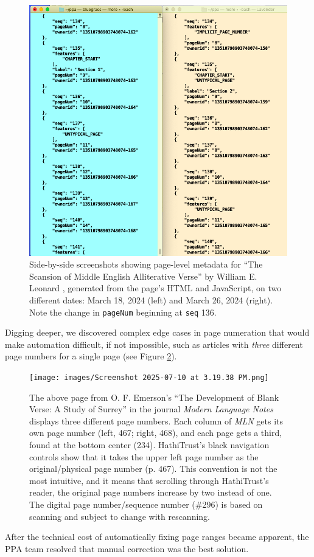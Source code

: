 \documentclass[final]{anthology-ch} %
\begin{document}
\begin{figure}
    \centering
    \includegraphics[width=0.5\linewidth]{images/y.png}
    \caption{Side-by-side screenshots showing page-level metadata for ``The Scansion of Middle English Alliterative Verse'' by William E. Leonard \cite{noauthor_scansion_nodate}, generated from the page's HTML and JavaScript, on two different dates: March 18, 2024 (left) and March 26, 2024 (right). Note the change in \texttt{pageNum} beginning at \texttt{seq} 136.}
    \label{fig:code-comparison}
\end{figure}

Digging deeper, we discovered complex edge cases in page numeration that would make automation difficult, if not impossible, such as articles with \textit{three} different page numbers for a single page (see Figure \ref{fig:MLN}).

\begin{figure}
    \centering
    \texttt{[image: images/Screenshot 2025-07-10 at 3.19.38 PM.png]}
    \caption{The above page from O. F. Emerson’s ``The Development of Blank Verse: A Study of Surrey'' in the journal \textit{Modern Language Notes} \cite{emerson_o_f_development_1889} displays three different page numbers. Each column of \textit{MLN }gets its own page number (left, 467; right, 468), and each page gets a third, found at the bottom center (234). HathiTrust's black navigation controls show that it takes the upper left page number as the original/physical page number (p. 467). This convention is not the most intuitive, and it means that scrolling through HathiTrust's reader, the original page numbers increase by two instead of one. The digital page number/sequence number (\#296) is based on scanning and subject to change with rescanning.}
    \label{fig:MLN}
\end{figure}

After the technical cost of automatically fixing page ranges became apparent, the PPA team resolved that manual correction was the best solution.
\end{document}
